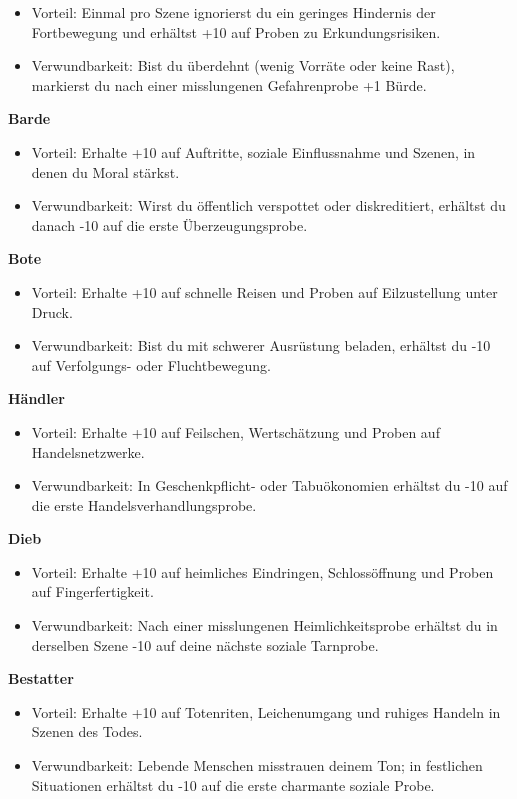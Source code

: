 \begin{itemize}[leftmargin=*,nosep]
\item Vorteil: Einmal pro Szene ignorierst du ein geringes Hindernis der Fortbewegung und erhältst +10 auf Proben zu Erkundungsrisiken.
\item Verwundbarkeit: Bist du überdehnt (wenig Vorräte oder keine Rast), markierst du nach einer misslungenen Gefahrenprobe +1 Bürde.
\end{itemize}
\noindent\textbf{Barde}\par
\begin{itemize}[leftmargin=*,nosep]
\item Vorteil: Erhalte +10 auf Auftritte, soziale Einflussnahme und Szenen, in denen du Moral stärkst.
\item Verwundbarkeit: Wirst du öffentlich verspottet oder diskreditiert, erhältst du danach -10 auf die erste Überzeugungsprobe.
\end{itemize}
\noindent\textbf{Bote}\par
\begin{itemize}[leftmargin=*,nosep]
\item Vorteil: Erhalte +10 auf schnelle Reisen und Proben auf Eilzustellung unter Druck.
\item Verwundbarkeit: Bist du mit schwerer Ausrüstung beladen, erhältst du -10 auf Verfolgungs- oder Fluchtbewegung.
\end{itemize}
\noindent\textbf{Händler}\par
\begin{itemize}[leftmargin=*,nosep]
\item Vorteil: Erhalte +10 auf Feilschen, Wertschätzung und Proben auf Handelsnetzwerke.
\item Verwundbarkeit: In Geschenkpflicht- oder Tabuökonomien erhältst du -10 auf die erste Handelsverhandlungsprobe.
\end{itemize}
\noindent\textbf{Dieb}\par
\begin{itemize}[leftmargin=*,nosep]
\item Vorteil: Erhalte +10 auf heimliches Eindringen, Schlossöffnung und Proben auf Fingerfertigkeit.
\item Verwundbarkeit: Nach einer misslungenen Heimlichkeitsprobe erhältst du in derselben Szene -10 auf deine nächste soziale Tarnprobe.
\end{itemize}
\noindent\textbf{Bestatter}\par
\begin{itemize}[leftmargin=*,nosep]
\item Vorteil: Erhalte +10 auf Totenriten, Leichenumgang und ruhiges Handeln in Szenen des Todes.
\item Verwundbarkeit: Lebende Menschen misstrauen deinem Ton; in festlichen Situationen erhältst du -10 auf die erste charmante soziale Probe.
\end{itemize}
